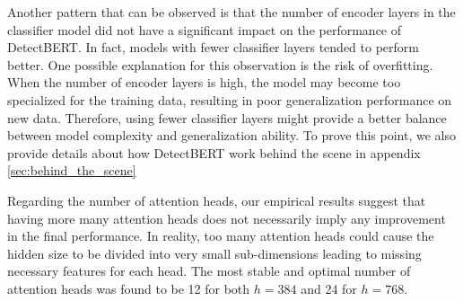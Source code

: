\documentclass{ieeeaccess}
\begin{document}
\par Another pattern  that can be observed is that the number of encoder layers in the classifier model did not have a significant impact on the performance of DetectBERT. In fact, models with fewer classifier layers tended to perform better. One possible explanation for this observation is the risk of overfitting. When the number of encoder layers is high, the model may become too specialized for the training data, resulting in poor generalization performance on new data. Therefore, using fewer classifier layers might provide a better balance between model complexity and generalization ability. To prove this point, we also provide details about how DetectBERT work behind the scene in appendix \ref{sec:behind_the_scene}

\par Regarding the number of attention heads, our empirical results suggest that having more  many attention heads does not necessarily imply any improvement in the final performance. In reality, too many attention heads could cause the hidden size to be divided into very small sub-dimensions leading to missing necessary features for each head. The most stable and optimal number of attention heads was found to be 12  for  both $h=384$ and 24 for $h=768$.
\end{document}

